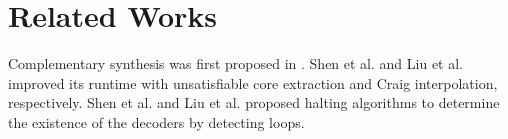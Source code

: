 \documentclass[journal]{IEEEtran}
\begin{document}
%

\section{Related Works}\label{sec_relwork}

Complementary synthesis was first proposed in \cite{ShengYuShen:iccad09}.
Shen et al. \cite{ShengYuShen:tcad} and Liu et al. \cite{Roland:iccad11} improved its runtime with unsatisfiable core extraction and Craig interpolation, 
respectively.
Shen et al. \cite{ShengYuShen:tcad11} and Liu et al. \cite{Roland:iccad11} proposed halting algorithms to determine the existence of the decoders by detecting loops.

%
%
\end{document}
